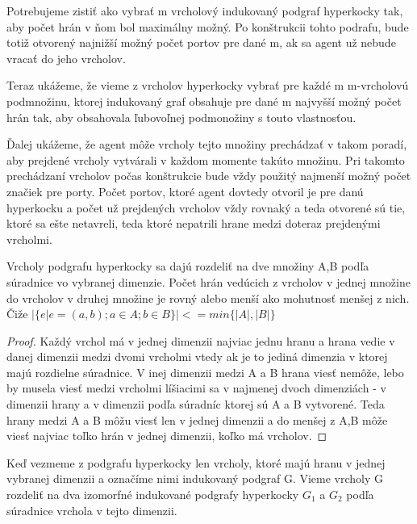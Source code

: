 Potrebujeme zistiť ako vybrať m vrcholový indukovaný podgraf hyperkocky tak, 
aby počet hrán v ňom bol maximálny možný. Po konštrukcii tohto podrafu, bude
totiž otvorený najnižší možný počet portov pre dané m, ak sa agent už nebude
vracať do jeho vrcholov.

Teraz ukážeme, že vieme z vrcholov hyperkocky vybrať pre každé m m-vrcholovú
podmnožinu, ktorej indukovaný graf obsahuje pre dané m najvyšší možný počet
hrán tak, aby obsahovala ľubovoľnej podmonožiny s touto vlastnosťou.

Ďalej ukážeme, že agent môže vrcholy tejto množiny prechádzať v takom
poradí, aby prejdené vrcholy vytvárali v každom momente takúto množinu. Pri
takomto prechádzaní vrcholov počas konštrukcie bude vždy použitý najmenší
možný počet značiek pre porty. Počet portov, ktoré agent dovtedy otvoril je
pre danú hyperkocku a počet už prejdených vrcholov vždy rovnaký a teda
otvorené sú tie, ktoré sa ešte netavreli, teda ktoré nepatrili hrane medzi
doteraz prejdenými vrcholmi.

\begin{lem}
Vrcholy podgrafu hyperkocky sa dajú rozdeliť na dve množiny A,B podľa súradnice vo
vybranej dimenzie. Počet hrán vedúcich z vrcholov v jednej množine do
vrcholov v druhej množine je rovný alebo menší ako mohutnosť menšej z nich.
Čiže $|\{e|e = (a,b);a \in A; b \in B\}| <= min\{|A|,|B|\}$
\end{lem}
\begin{proof}
Každý vrchol má v jednej dimenzii najviac jednu hranu a hrana vedie v
danej dimenzii medzi dvomi vrcholmi vtedy ak je to jediná dimenzia v ktorej
majú rozdielne súradnice. V inej dimenzii medzi A a B hrana viesť nemôže,
lebo by musela viesť medzi vrcholmi líšiacimi sa v najmenej dvoch 
dimenziách - v dimenzii hrany a v dimenzii podľa súradníc ktorej 
sú A a B vytvorené. Teda hrany medzi A a B môžu viesť len v jednej dimenzii
a do menšej z A,B môže viesť najviac toľko hrán v jednej dimenzii, koľko má
vrcholov.
\end{proof}

\begin{lem}
\label{izomorfne}
Keď vezmeme z podgrafu hyperkocky len vrcholy, ktoré majú hranu v jednej
vybranej dimenzii a označíme nimi indukovaný podgraf G. Vieme vrcholy G
rozdeliť na dva izomorfné indukované podgrafy hyperkocky $G_{1}$ a $G_{2}$
podľa súradnice vrchola v tejto dimenzii.
\end{lem}

